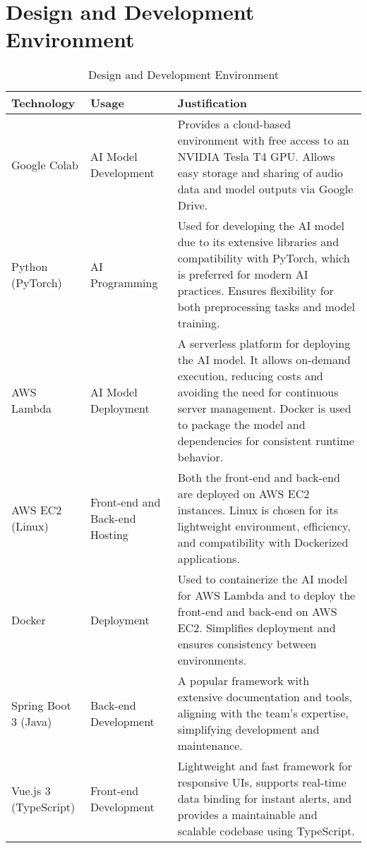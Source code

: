 \documentclass[conference]{IEEEtran}
\begin{document}
\section{Design and Development Environment}
\begin{table}[H]
    \centering
    \caption{Design and Development Environment}
    \begin{adjustbox}{max width=\textwidth}
        \begin{tabular}{|>{\centering\arraybackslash}m{1.2cm}|>{\centering\arraybackslash}m{1.6cm}|m{4.8cm}|}
        \hline
        \textbf{Technology} & \textbf{Usage} & \textbf{Justification} \\
        \hline
        Google Colab & AI Model Development & Provides a cloud-based environment with free access to an NVIDIA Tesla T4 GPU. Allows easy storage and sharing of audio data and model outputs via Google Drive. \\
        \hline
        Python (PyTorch) & AI Programming & Used for developing the AI model due to its extensive libraries and compatibility with PyTorch, which is preferred for modern AI practices. Ensures flexibility for both preprocessing tasks and model training. \\
        \hline
        AWS Lambda & AI Model Deployment & A serverless platform for deploying the AI model. It allows on-demand execution, reducing costs and avoiding the need for continuous server management. Docker is used to package the model and dependencies for consistent runtime behavior. \\
        \hline
        AWS EC2 (Linux) & Front-end and Back-end Hosting & Both the front-end and back-end are deployed on AWS EC2 instances. Linux is chosen for its lightweight environment, efficiency, and compatibility with Dockerized applications. \\
        \hline
        Docker & Deployment & Used to containerize the AI model for AWS Lambda and to deploy the front-end and back-end on AWS EC2. Simplifies deployment and ensures consistency between environments. \\
        \hline
        Spring Boot 3 (Java) & Back-end Development & A popular framework with extensive documentation and tools, aligning with the team's expertise, simplifying development and maintenance. \\
        \hline
        Vue.js 3 (TypeScript) & Front-end Development & Lightweight and fast framework for responsive UIs, supports real-time data binding for instant alerts, and provides a maintainable and scalable codebase using TypeScript. \\
        \hline
    \end{tabular}
    \end{adjustbox}
\end{table}
\end{document}
